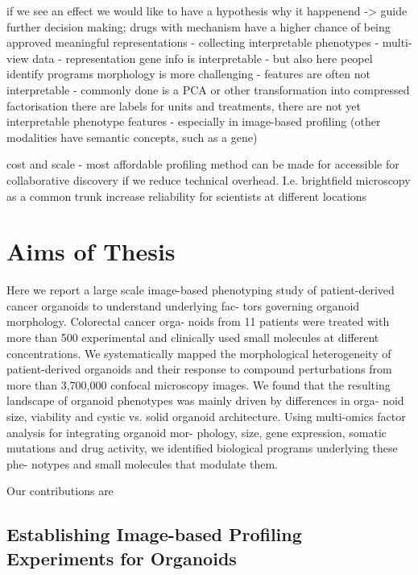 \begin{flushleft}
if we see an effect we would like to have a hypothesis why it happenend -> guide further decision making; drugs with mechanism have a higher chance of being approved
meaningful representations - collecting interpretable phenotypes - multi-view data - representation
gene info is interpretable - but also here peopel identify programs
morphology is more challenging - features are often not interpretable - commonly done is a PCA or other transformation into compressed
factorisation
there are labels for units and treatments, there are not yet interpretable phenotype features - especially in image-based profiling (other modalities have semantic concepts, such as a gene)


cost and scale - most affordable profiling method
can be made for accessible for collaborative discovery if we reduce technical overhead. I.e. brightfield microscopy as a common trunk 
increase reliability for scientists at different locations








\section{Aims of Thesis}
Here we report a large scale image-based phenotyping study of patient-derived cancer organoids to understand underlying fac- tors governing organoid morphology. Colorectal cancer orga- noids from 11 patients were treated with more than 500 experimental and clinically used small molecules at different concentrations. We systematically mapped the morphological heterogeneity of patient-derived organoids and their response to compound perturbations from more than 3,700,000 confocal microscopy images. We found that the resulting landscape of organoid phenotypes was mainly driven by differences in orga- noid size, viability and cystic vs. solid organoid architecture. Using multi-omics factor analysis for integrating organoid mor- phology, size, gene expression, somatic mutations and drug activity, we identified biological programs underlying these phe- notypes and small molecules that modulate them.

Our contributions are

\subsection{Establishing Image-based Profiling Experiments for Organoids}


\end{flushleft}

